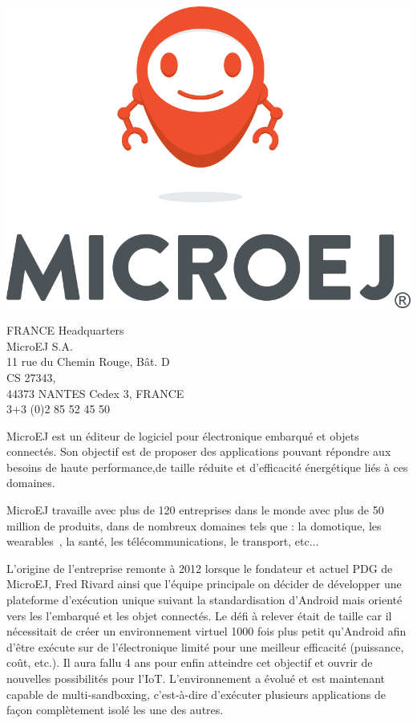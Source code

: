 \documentclass[french,a4paper,12pt]{report}
\begin{document}
\noindent
\begin{minipage}[c]{0.5\textwidth}
\centering
\includegraphics[width=0.8\linewidth]{ressources/logos/vertical_mascot_huge.png}
\end{minipage}
\noindent
\begin{minipage}[c]{0.49\textwidth}\raggedright
 FRANCE Headquarters\\
 MicroEJ S.A.\\
 11 rue du Chemin Rouge, Bât. D\\
 CS 27343,\\
 44373 NANTES Cedex 3, FRANCE\\
 3+3 (0)2 85 52 45 50\\
\end{minipage}

\bigskip

MicroEJ est un éditeur de logiciel pour électronique embarqué et objets connectés. Son objectif est de proposer des applications pouvant répondre aux besoins de haute performance,de taille réduite et d'efficacité énergétique liés à ces domaines.

MicroEJ travaille avec plus de 120 entreprises dans le monde avec plus de 50 million de produits, dans de nombreux domaines tels que : la domotique, les wearables , la santé, les télécommunications, le transport, etc...

L’origine de l’entreprise remonte à 2012 lorsque le fondateur et actuel PDG de MicroEJ, Fred Rivard ainsi que l’équipe principale on décider de développer une plateforme d’exécution unique suivant la standardisation d’Android mais orienté vers les l'embarqué et les objet connectés. Le défi à relever était de taille car il nécessitait de créer un environnement virtuel 1000 fois plus petit qu’Android afin d’être exécute sur de l’électronique limité pour une meilleur efficacité (puissance, coût, etc.). Il aura fallu 4 ans pour enfin atteindre cet objectif et ouvrir de nouvelles possibilités pour l’IoT. 
L'environnement a évolué et est maintenant capable de multi-sandboxing, c'est-à-dire d’exécuter plusieurs applications de façon complètement isolé les une des autres.
\end{document}
